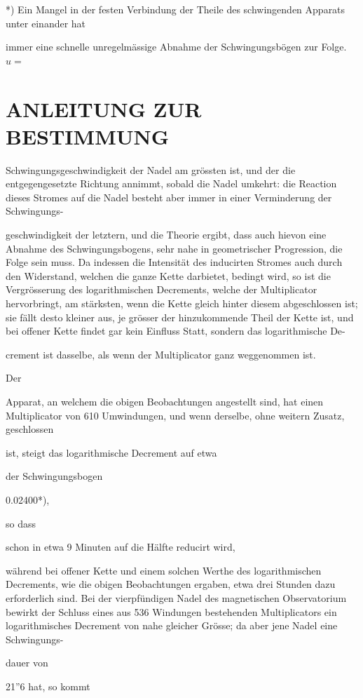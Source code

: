 \documentclass[12pt,a4paper]{article}
\begin{document}
*) Ein Mangel in der festen Verbindung der Theile des schwingenden Apparats unter einander hat

immer eine schnelle unregelmässige Abnahme der Schwingungsbögen zur Folge. $u =$

\section*{ANLEITUNG ZUR BESTIMMUNG}
Schwingungsgeschwindigkeit der Nadel am grössten ist, und der die entgegengesetzte Richtung annimmt, sobald die Nadel umkehrt: die Reaction dieses Stromes auf die Nadel besteht aber immer in einer Verminderung der Schwingungs-

geschwindigkeit der letztern, und die Theorie ergibt, dass auch hievon eine Abnahme des Schwingungsbogens, sehr nahe in geometrischer Progression, die Folge sein muss. Da indessen die Intensität des inducirten Stromes auch durch den Widerstand, welchen die ganze Kette darbietet, bedingt wird, so ist die Vergrösserung des logarithmischen Decrements, welche der Multiplicator hervorbringt, am stärksten, wenn die Kette gleich hinter diesem abgeschlossen ist; sie fällt desto kleiner aus, je grösser der hinzukommende Theil der Kette ist, und bei offener Kette findet gar kein Einfluss Statt, sondern das logarithmische De-

crement ist dasselbe, als wenn der Multiplicator ganz weggenommen ist.

Der

Apparat, an welchem die obigen Beobachtungen angestellt sind, hat einen Multiplicator von 610 Umwindungen, und wenn derselbe, ohne weitern Zusatz, geschlossen

ist, steigt das logarithmische Decrement auf etwa

der Schwingungsbogen

0.02400*),

so dass

schon in etwa 9 Minuten auf die Hälfte reducirt wird,

während bei offener Kette und einem solchen Werthe des logarithmischen Decrements, wie die obigen Beobachtungen ergaben, etwa drei Stunden dazu erforderlich sind. Bei der vierpfündigen Nadel des magnetischen Observatorium bewirkt der Schluss eines aus 536 Windungen bestehenden Multiplicators ein logarithmisches Decrement von nahe gleicher Grösse; da aber jene Nadel eine Schwingungs-

dauer von

21”6 hat, so kommt
\end{document}
